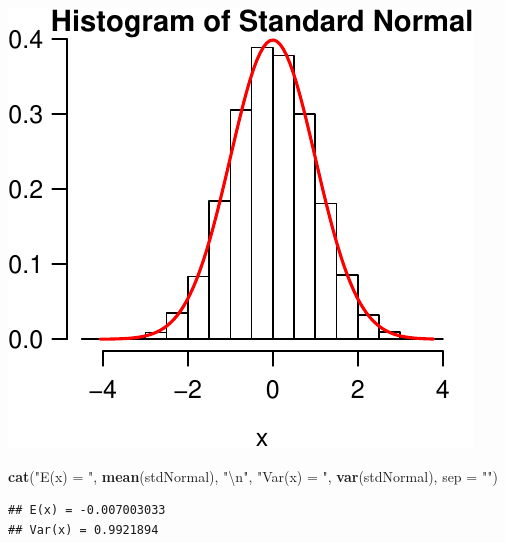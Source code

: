 \documentclass[11pt,]{article}
\newenvironment{Shaded}{\begin{snugshade}}{\end{snugshade}}
\newcommand{\KeywordTok}[1]{\textcolor[rgb]{0.13,0.29,0.53}{\textbf{{#1}}}}
\newcommand{\DataTypeTok}[1]{\textcolor[rgb]{0.13,0.29,0.53}{{#1}}}
\newcommand{\CharTok}[1]{\textcolor[rgb]{0.31,0.60,0.02}{{#1}}}
\newcommand{\StringTok}[1]{\textcolor[rgb]{0.31,0.60,0.02}{{#1}}}
\newcommand{\NormalTok}[1]{{#1}}
\begin{document}
\begin{center}\includegraphics{Hw1_Solution_files/figure-latex/plotSNcompare-1} \end{center}

\begin{Shaded}
\begin{Highlighting}[]
\KeywordTok{cat}\NormalTok{(}\StringTok{"E(x) = "}\NormalTok{, }\KeywordTok{mean}\NormalTok{(stdNormal), }\StringTok{"}\CharTok{\textbackslash{}n}\StringTok{"}\NormalTok{,}
    \StringTok{"Var(x) = "}\NormalTok{, }\KeywordTok{var}\NormalTok{(stdNormal), }\DataTypeTok{sep =} \StringTok{""}\NormalTok{)}
\end{Highlighting}
\end{Shaded}

\begin{verbatim}
## E(x) = -0.007003033
## Var(x) = 0.9921894
\end{verbatim}

\newpage
\singlespacing 
\end{document}
